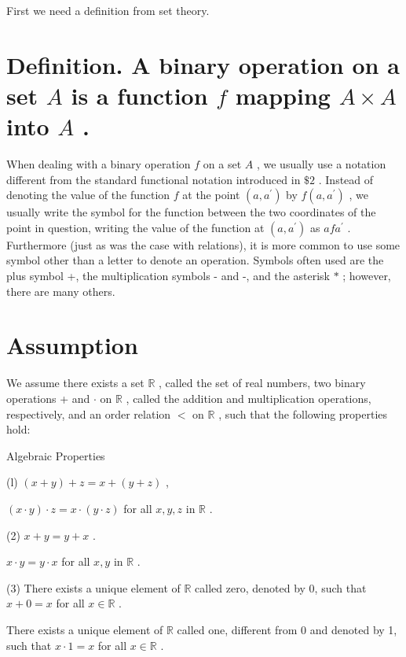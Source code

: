 First we need a definition from set theory.

\section*{Definition. A binary operation on a set \(A\) is a function \(f\) mapping \(A \times  A\) into \(A\) .}

When dealing with a binary operation \(f\) on a set \(A\) , we usually use a notation different from the standard functional notation introduced in \(\$ 2\) . Instead of denoting the value of the function \(f\) at the point \(\left( {a,{a}^{\prime }}\right)\) by \(f\left( {a,{a}^{\prime }}\right)\) , we usually write the symbol for the function between the two coordinates of the point in question, writing the value of the function at \(\left( {a,{a}^{\prime }}\right)\) as \({af}{a}^{\prime }\) . Furthermore (just as was the case with relations), it is more common to use some symbol other than a letter to denote an operation. Symbols often used are the plus symbol +, the multiplication symbols - and -, and the asterisk \(*\) ; however, there are many others.

\section*{Assumption}

We assume there exists a set \(\mathbb{R}\) , called the set of real numbers, two binary operations + and \(\cdot\) on \(\mathbb{R}\) , called the addition and multiplication operations, respectively, and an order relation \(<\) on \(\mathbb{R}\) , such that the following properties hold:

Algebraic Properties

(l) \(\left( {x + y}\right)  + z = x + \left( {y + z}\right)\) ,

\(\left( {x \cdot  y}\right)  \cdot  z = x \cdot  \left( {y \cdot  z}\right)\) for all \(x,y,z\) in \(\mathbb{R}\) .

(2) \(x + y = y + x\) .

\(x \cdot  y = y \cdot  x\) for all \(x,y\) in \(\mathbb{R}\) .

(3) There exists a unique element of \(\mathbb{R}\) called zero, denoted by 0, such that \(x + 0 = x\) for all \(x \in  \mathbb{R}\) .

There exists a unique element of \(\mathbb{R}\) called one, different from 0 and denoted by 1, such that \(x \cdot  1 = x\) for all \(x \in  \mathbb{R}\) .


